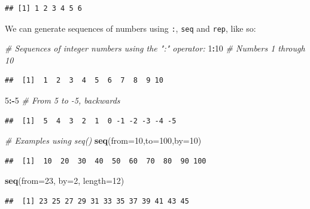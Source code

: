 \documentclass[]{book}
\newenvironment{Shaded}{\begin{snugshade}}{\end{snugshade}}
\newcommand{\CommentTok}[1]{\textcolor[rgb]{0.56,0.35,0.01}{\textit{#1}}}
\newcommand{\DataTypeTok}[1]{\textcolor[rgb]{0.13,0.29,0.53}{#1}}
\newcommand{\DecValTok}[1]{\textcolor[rgb]{0.00,0.00,0.81}{#1}}
\newcommand{\KeywordTok}[1]{\textcolor[rgb]{0.13,0.29,0.53}{\textbf{#1}}}
\newcommand{\NormalTok}[1]{#1}
\newcommand{\OperatorTok}[1]{\textcolor[rgb]{0.81,0.36,0.00}{\textbf{#1}}}
\begin{document}
\begin{verbatim}
## [1] 1 2 3 4 5 6
\end{verbatim}

We can generate sequences of numbers using \texttt{:}, \texttt{seq} and \texttt{rep}, like so:

\begin{Shaded}
\begin{Highlighting}[]
\CommentTok{# Sequences of integer numbers using the ":" operator:}
\DecValTok{1}\OperatorTok{:}\DecValTok{10}   \CommentTok{# Numbers 1 through 10}
\end{Highlighting}
\end{Shaded}

\begin{verbatim}
##  [1]  1  2  3  4  5  6  7  8  9 10
\end{verbatim}

\begin{Shaded}
\begin{Highlighting}[]
\DecValTok{5}\OperatorTok{:-}\DecValTok{5}   \CommentTok{# From 5 to -5, backwards}
\end{Highlighting}
\end{Shaded}

\begin{verbatim}
##  [1]  5  4  3  2  1  0 -1 -2 -3 -4 -5
\end{verbatim}

\begin{Shaded}
\begin{Highlighting}[]
\CommentTok{# Examples using seq()}
\KeywordTok{seq}\NormalTok{(}\DataTypeTok{from=}\DecValTok{10}\NormalTok{,}\DataTypeTok{to=}\DecValTok{100}\NormalTok{,}\DataTypeTok{by=}\DecValTok{10}\NormalTok{)}
\end{Highlighting}
\end{Shaded}

\begin{verbatim}
##  [1]  10  20  30  40  50  60  70  80  90 100
\end{verbatim}

\begin{Shaded}
\begin{Highlighting}[]
\KeywordTok{seq}\NormalTok{(}\DataTypeTok{from=}\DecValTok{23}\NormalTok{, }\DataTypeTok{by=}\DecValTok{2}\NormalTok{, }\DataTypeTok{length=}\DecValTok{12}\NormalTok{)}
\end{Highlighting}
\end{Shaded}

\begin{verbatim}
##  [1] 23 25 27 29 31 33 35 37 39 41 43 45
\end{verbatim}
\end{document}
